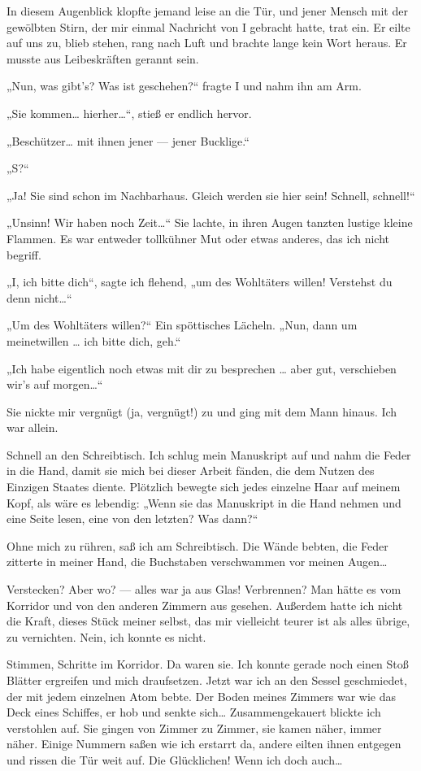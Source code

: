 In diesem Augenblick klopfte
jemand leise an die Tür, und jener Mensch mit der gewölbten Stirn,
der mir einmal Nachricht von I gebracht hatte, trat ein. Er eilte
auf uns zu, blieb stehen, rang nach Luft und brachte lange kein
Wort heraus. Er musste aus Leibeskräften gerannt sein.

„Nun, was
gibt's? Was ist geschehen?“ fragte I und nahm ihn am Arm.

„Sie kommen\ldots{} hierher\ldots{}“, stieß er endlich hervor.

„Beschützer\ldots{} mit ihnen jener — jener Bucklige.“

„S?“

„Ja! Sie sind schon im Nachbarhaus. Gleich werden sie hier sein!
Schnell, schnell!“

„Unsinn! Wir haben noch Zeit\ldots{}“ Sie lachte, in ihren Augen tanzten
lustige kleine Flammen. Es war entweder tollkühner Mut oder etwas
anderes, das ich nicht begriff.

„I, ich bitte dich“, sagte ich flehend, „um des Wohltäters willen!
Verstehst du denn nicht\ldots{}“

„Um des Wohltäters willen?“ Ein spöttisches Lächeln. „Nun, dann um
meinetwillen \ldots{} ich bitte dich, geh.“

„Ich habe eigentlich noch
etwas mit dir zu besprechen \ldots{} aber gut, verschieben wir's auf
morgen\ldots{}“

Sie nickte mir vergnügt (ja, vergnügt!) zu und ging mit
dem Mann hinaus. Ich war allein.

Schnell an den Schreibtisch. Ich schlug mein Manuskript auf und
nahm die Feder in die Hand, damit sie mich bei dieser Arbeit
fänden, die dem Nutzen des Einzigen Staates diente. Plötzlich
bewegte sich jedes einzelne Haar auf meinem Kopf, als wäre es
lebendig: „Wenn sie das Manuskript in die Hand nehmen und eine
Seite lesen, eine von den letzten? Was dann?“

Ohne mich zu rühren, saß ich am Schreibtisch. Die Wände bebten, die
Feder zitterte in meiner Hand, die Buchstaben verschwammen vor
meinen Augen\ldots{}

Verstecken? Aber wo? — alles war ja aus Glas!
Verbrennen? Man hätte es vom Korridor und von den anderen Zimmern
aus gesehen. Außerdem hatte ich nicht die Kraft, dieses Stück
meiner selbst, das mir vielleicht teurer ist als alles übrige, zu
vernichten. Nein, ich konnte es nicht.

Stimmen, Schritte im
Korridor. Da waren sie. Ich konnte gerade noch einen Stoß Blätter
ergreifen und mich draufsetzen. Jetzt war ich an den Sessel
geschmiedet, der mit jedem einzelnen Atom bebte. Der Boden meines
Zimmers war wie das Deck eines Schiffes, er hob und senkte sich\ldots{}
Zusammengekauert blickte ich verstohlen auf. Sie gingen von Zimmer
zu Zimmer, sie kamen näher, immer näher. Einige Nummern saßen wie
ich erstarrt da, andere eilten ihnen entgegen und rissen die Tür
weit auf. Die Glücklichen! Wenn ich doch auch\ldots{}

